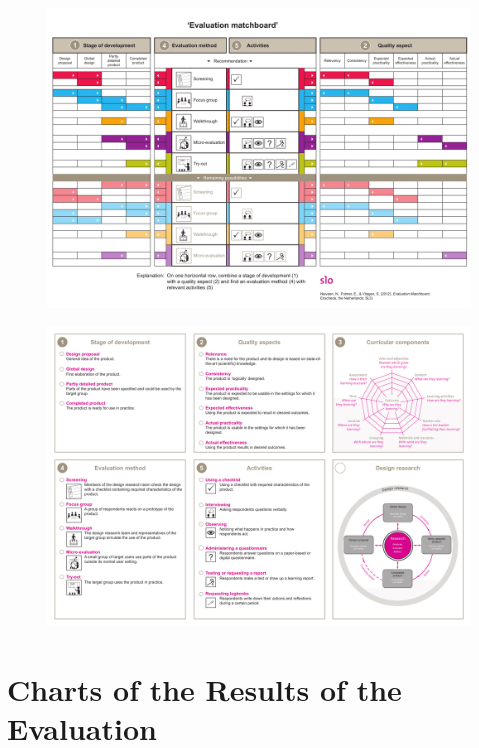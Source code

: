 \documentclass[11pt,twoside]{report} %
\begin{document}
\begin{landscape}

\begin{figure}[h!]
\centering
\includegraphics[height=\textheight]{Evaluation_matchboard-2}
\end{figure}

\begin{figure}[h]
\centering
\includegraphics[height=\textheight]{Evaluation_matchboard-1}
\end{figure}

\end{landscape}

\FloatBarrier

\chapter{Charts of the Results of the Evaluation}
\label{app:resultcharts}
\end{document}
